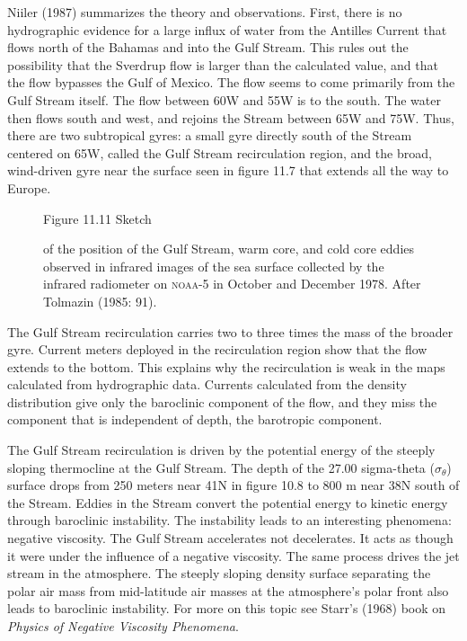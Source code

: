 Niiler (1987) summarizes the theory and observations. First, there is no
hydrographic evidence for a large influx of water from the Antilles Current that
flows north of the Bahamas and into the Gulf Stream. This rules out the
possibility that the Sverdrup flow is larger than the calculated value, and
that the flow bypasses the Gulf of Mexico. The flow seems to come primarily from
the Gulf Stream itself. The flow between 60\degrees W and 55\degrees W is to the
south. The water then flows south and west, and rejoins the Stream between
65\degrees W and 75\degrees W. Thus, there are two subtropical gyres: a small
gyre directly south of the Stream centered on 65\degrees W, called the Gulf Stream recirculation
region, and the broad, wind-driven gyre near the surface seen in figure 11.7
that extends all the way to Europe.


\begin{figure}[t!]
\footnotesize Figure 11.11 Sketch \rule{0mm}{3ex}of the position of the
Gulf Stream, warm core, and cold core eddies observed in infrared
images of the sea surface collected by the infrared radiometer on
\textsc{noaa}-5 in October and December 1978. After Tolmazin (1985: 91).

\label{fig:ringsmap}
\vspace{-4ex}
\end{figure}

The Gulf Stream recirculation carries two to three times the mass of the broader
gyre. Current meters deployed in the recirculation region show that the flow
extends to the bottom. This explains why the recirculation is weak in the maps
calculated from hydrographic data. Currents
calculated from the density distribution give only the baroclinic component of the flow, and
they miss the component that is independent of depth, the barotropic component.

The Gulf Stream recirculation is driven by the potential energy of the steeply
sloping thermocline at the Gulf Stream. The depth of the
27.00 sigma-theta ($\sigma_{\theta}$) surface drops from 250 meters near 41\degrees N
in figure 10.8 to 800 m near 38\degrees N south of the Stream. Eddies in the
Stream convert the potential energy to kinetic energy through baroclinic
instability. The instability leads to an interesting phenomena: negative
viscosity. The Gulf Stream accelerates not decelerates. It acts as
though it were under the influence of a negative viscosity. The same process
drives the jet stream in the atmosphere. The steeply sloping density surface
separating the polar air mass from mid-latitude air masses at the atmosphere's
polar front also leads to baroclinic instability. For more on this topic
see Starr's (1968) book on
\textit{Physics of Negative Viscosity Phenomena}.

